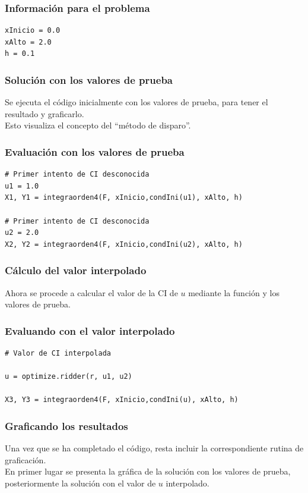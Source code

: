 \documentclass[12pt]{beamer}
\begin{document}
\begin{frame}[fragile]
\frametitle{Información para el problema}
\begin{lstlisting}[caption=Declaración del intervalo y paso de integración  ]
xInicio = 0.0
xAlto = 2.0
h = 0.1
\end{lstlisting}
\end{frame}
\begin{frame}
\frametitle{Solución con los valores de prueba}
Se ejecuta el código inicialmente con los valores de prueba, para tener el resultado y graficarlo.
\\
\bigskip
\pause
Esto visualiza el concepto del \enquote{método de disparo}.
\end{frame}
\begin{frame}[fragile]
\frametitle{Evaluación con los valores de prueba}
\begin{lstlisting}[caption=Ocupando los valores de prueba]
# Primer intento de CI desconocida
u1 = 1.0
X1, Y1 = integraorden4(F, xInicio,condIni(u1), xAlto, h)

# Primer intento de CI desconocida
u2 = 2.0
X2, Y2 = integraorden4(F, xInicio,condIni(u2), xAlto, h)
\end{lstlisting}
\end{frame}
\begin{frame}
\frametitle{Cálculo del valor interpolado}
Ahora se procede a calcular el valor de la CI de $u$ mediante la función  y los valores de prueba.
\end{frame}
\begin{frame}[fragile]
\frametitle{Evaluando con el valor interpolado}
\begin{lstlisting}[caption=Calculando el valor interpolado para luego usarlo]
# Valor de CI interpolada

u = optimize.ridder(r, u1, u2)

X3, Y3 = integraorden4(F, xInicio,condIni(u), xAlto, h)
\end{lstlisting}
\end{frame}
\begin{frame}
\frametitle{Graficando los resultados}
Una vez que se ha completado el código, resta incluir la correspondiente rutina de graficación.
\\
\bigskip
\pause
En primer lugar se presenta la gráfica de la solución con los valores de prueba, posteriormente la solución con el valor de $u$ interpolado.
\end{frame}
\end{document}
